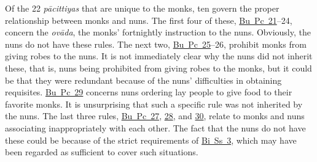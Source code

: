 \documentclass[12pt,openany]{book}%
\begin{document}
Of the 22 \textit{\textsanskrit{pācittiyas}} that are unique to the monks, ten govern the proper relationship between monks and nuns. The first four of these, \href{https://suttacentral.net/pli-tv-bu-vb-pc21/en/brahmali\#1.44.1}{Bu~Pc~21}–24, concern the \textit{\textsanskrit{ovāda}}, the monks’ fortnightly instruction to the nuns. Obviously, the nuns do not have these rules. The next two, \href{https://suttacentral.net/pli-tv-bu-vb-pc25/en/brahmali\#2.11.1}{Bu~Pc~25}–26, prohibit monks from giving robes to the nuns. It is not immediately clear why the nuns did not inherit these, that is, nuns being prohibited from giving robes to the monks, but it could be that they were redundant because of the nuns’ difficulties in obtaining requisites. \href{https://suttacentral.net/pli-tv-bu-vb-pc29/en/brahmali\#2.13.1}{Bu~Pc~29} concerns nuns ordering lay people to give food to their favorite monks. It is unsurprising that such a specific rule was not inherited by the nuns. The last three rules, \href{https://suttacentral.net/pli-tv-bu-vb-pc27/en/brahmali\#2.15.1}{Bu~Pc~27}, \href{https://suttacentral.net/pli-tv-bu-vb-pc28/en/brahmali\#2.16.1}{28}, and \href{https://suttacentral.net/pli-tv-bu-vb-pc30/en/brahmali\#1.13.1}{30}, relate to monks and nuns associating inappropriately with each other. The fact that the nuns do not have these could be because of the strict requirements of \href{https://suttacentral.net/pli-tv-bi-vb-ss3/en/brahmali\#4.14.1}{Bi~Ss~3}, which may have been regarded as sufficient to cover such situations.
\end{document}
